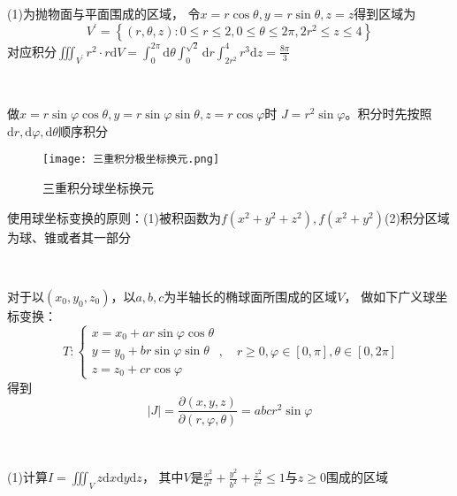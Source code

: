 \begin{solution}
  (1)为抛物面与平面围成的区域，
  令$x = r \cos \theta, y = r \sin \theta, z = z$得到区域为
  \begin{equation*}
    V^{\prime} = \left\{ (r,\theta,z): 0 \leq r \leq 2, 0 \leq \theta \leq 2\pi, 2r^2 \leq z \leq 4 \right\}
  \end{equation*}
  对应积分$\iiint_{V^{\prime}} r^2 \cdot r \mathrm{d}V = \int_0^{2\pi}\mathrm{d} \theta \int_0^{\sqrt{2}}\mathrm{d} r \int_{2r^2}^4r^3\mathrm{d}z = \frac{8\pi}{3}$
\end{solution}

~

\begin{theorem}[球坐标变换]
  做$x = r \sin \varphi \cos \theta, y = r \sin \varphi \sin \theta, z = r \cos \varphi$时
  $J = r^2 \sin \varphi$。积分时先按照$\mathrm{d}r,\mathrm{d}\varphi, \mathrm{d}\theta$顺序积分
\end{theorem}


\begin{figure}[htp]
  \centering
  \texttt{[image: 三重积分极坐标换元.png]}
  \caption{三重积分球坐标换元}
\end{figure}

\begin{note}
  使用球坐标变换的原则：(1)被积函数为$f(x^2 + y^2 + z^2),f(x^2+y^2)$(2)积分区域为球、锥或者其一部分
\end{note}

~

\begin{theorem}[广义球坐标变换]
  对于以$(x_0,y_0,z_0)$，以$a,b,c$为半轴长的椭球面所围成的区域$V$，
  做如下广义球坐标变换：
  \begin{equation*}
    T:
    \begin{cases}
      x = x_0 + ar \sin \varphi \cos \theta\\
      y = y_0 + br \sin \varphi \sin \theta\\
      z = z_0 + cr \cos \varphi
    \end{cases} , \quad r \geq 0, \varphi \in [0,\pi], \theta \in [0,2\pi]
  \end{equation*}
  得到
  \begin{equation*}
    |J| = \frac{\partial(x,y,z)}{\partial(r,\varphi,\theta)} = abcr^2 \sin \varphi
  \end{equation*}
\end{theorem}

~

\begin{exercise}[广义球坐标变换]
  (1)计算$I = \iiint_V z \mathrm{d} x \mathrm{d} y \mathrm{d} z$，
  其中$V$是$\frac{x^2}{a^2} + \frac{y^2}{b^2} + \frac{z^2}{c^2} \leq 1$与$z \geq 0$围成的区域
\end{exercise}

